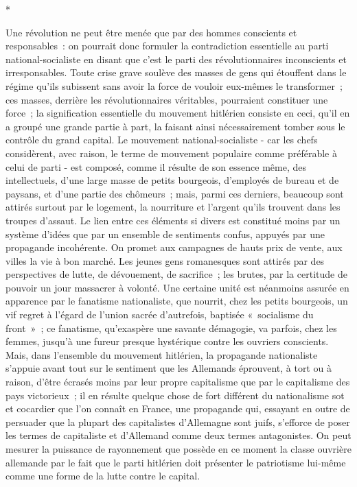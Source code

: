 \documentclass[french,twoside]{book} %
\begin{document}
\begin{center}
*\end{center}
\noindent Une révolution ne peut être menée que par des hommes conscients et responsables : on pourrait donc formuler la contradiction essentielle au parti national-socialiste en disant que c'est le parti des révolutionnaires inconscients et irresponsables. Toute crise grave soulève des masses de gens qui étouffent dans le régime qu'ils subissent sans avoir la force de vouloir eux-mêmes le transformer ; ces masses, derrière les révolutionnaires véritables, pourraient constituer une force ; la signification essentielle du mouvement hitlérien con­siste en ceci, qu'il en a groupé une grande partie à part, la faisant ainsi nécessairement tomber sous le contrôle du grand capital. Le mouvement national-socialiste - car les chefs considèrent, avec raison, le terme de mouve­ment populaire comme préférable à celui de parti - est composé, comme il résulte de son essence même, des intellectuels, d'une large masse de petits bourgeois, d'employés de bureau et de paysans, et d'une partie des chômeurs ; mais, parmi ces derniers, beaucoup sont attirés surtout par le logement, la nourriture et l'argent qu'ils trouvent dans les troupes d'assaut. Le lien entre ces éléments si divers est constitué moins par un système d'idées que par un ensemble de sentiments confus, appuyés par une propagande incohérente. On promet aux campagnes de hauts prix de vente, aux villes la vie à bon marché. Les jeunes gens romanesques sont attirés par des perspectives de lutte, de dévouement, de sacrifice ; les brutes, par la certitude de pouvoir un jour massacrer à volonté. Une certaine unité est néanmoins assurée en apparence par le fanatisme nationaliste, que nourrit, chez les petits bourgeois, un vif regret à l'égard de l'union sacrée d'autrefois, baptisée « socialisme du front » ; ce fanatisme, qu'exaspère une savante démagogie, va parfois, chez les fem­mes, jusqu'à une fureur presque hystérique contre les ouvriers conscients. Mais, dans l'ensemble du mouvement hitlérien, la propagande nationaliste s'appuie avant tout sur le sentiment que les Allemands éprouvent, à tort ou à raison, d'être écrasés moins par leur propre capitalisme que par le capitalisme des pays victorieux ; il en résulte quelque chose de fort différent du natio­nalisme sot et cocardier que l'on connaît en France, une propagande qui, essayant en outre de persuader que la plupart des capitalistes d'Allemagne sont juifs, s'efforce de poser les termes de capitaliste et d'Allemand comme deux termes antagonistes. On peut mesurer la puissance de rayonnement que possède en ce moment la classe ouvrière allemande par le fait que le parti hitlérien doit présenter le patriotisme lui-même comme une forme de la lutte contre le capital.\par
\end{document}
